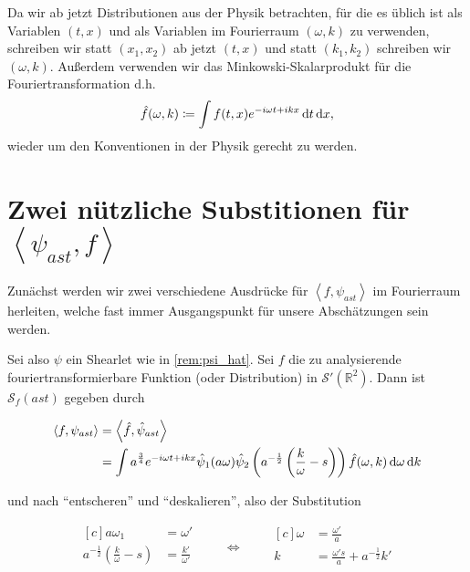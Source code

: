 
\begin{remark}[Notation]
    Da wir ab jetzt Distributionen aus der Physik betrachten, für die es üblich ist als Variablen $(t, x)$ und als Variablen im Fourierraum $(\omega, k)$ zu verwenden, schreiben wir statt $(x_1, x_2)$ ab jetzt $(t,x)$ und statt $(k_1, k_2)$ schreiben wir $(\omega, k)$. Außerdem verwenden wir das Minkowski-Skalarprodukt für die Fouriertransformation d.h.
    \begin{equation*}
        \hat f (\omega, k) \coloneqq \int f(t,x) e^{-i\omega t + i k x}
        \mathop{}\!\mathrm{d} t \mathop{}\!\mathrm{d} x
        ,
    \end{equation*}
    wieder um den Konventionen in der Physik gerecht zu werden.
\end{remark}

\section{\texorpdfstring{Zwei nützliche Substitionen für  $\left<\psi_{ast}, f\right>$}{Zwei nützliche Substitutionen}}
\label{sec:substitutionen}

Zunächst werden wir zwei verschiedene Ausdrücke für $\left< f, \psi_{ast} \right>$
im Fourierraum herleiten, welche fast immer Ausgangspunkt für unsere Abschätzungen sein werden.

Sei also $\psi$ ein Shearlet wie in \cref{rem:psi_hat}. Sei $f$ die zu
analysierende fouriertransformierbare Funktion (oder Distribution) in
$\mathcal{S}' (\mathbb{R}^2)$. Dann ist $\mathcal{S}_f (ast)$ gegeben durch

\begin{align*}
\left<f, \psi_{ast}\right> &= \left< \hat f, \hat\psi_{ast}\right> \\
 &= \int a^{\frac{3}{4}} e^{-i \omega t + ikx} \hat \psi_1(a \omega)
    \hat \psi_2 \left(a^{-\frac{1}{2}} \left(\frac{k}{\omega} - s\right)\right)
    \hat f (\omega,k) \mathop{}\!\mathrm{d} \omega \mathop{}\!\mathrm{d} k
\end{align*}

und nach "`entscheren"' und "`deskalieren"', also der Substitution

\begin{equation}
\begin{aligned}[c]
a \omega_1 &= \omega'\\
a^{-\frac{1}{2}} \left(\frac{k}{\omega} - s\right) &=\frac{k'}{\omega'}\\
\end{aligned}
\qquad\Longleftrightarrow\qquad
\begin{aligned}[c]
\omega &= \frac{\omega'}{a}\\
k &= \frac{\omega' s}{a} + a^{-\frac{1}{2}} k'\\
\end{aligned}
\label{eq:substitution1_coords}
\end{equation}

